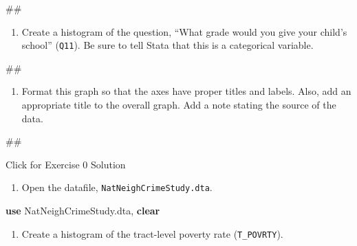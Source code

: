 \documentclass[
]{book}
\newenvironment{Shaded}{\begin{snugshade}}{\end{snugshade}}
\newcommand{\KeywordTok}[1]{\textcolor[rgb]{0.13,0.29,0.53}{\textbf{#1}}}
\newcommand{\NormalTok}[1]{#1}
\providecommand{\tightlist}{%
  \setlength{\itemsep}{0pt}\setlength{\parskip}{0pt}}
\begin{document}
\begin{Shaded}
\begin{Highlighting}[]
\NormalTok{\#\#}
\end{Highlighting}
\end{Shaded}

\begin{enumerate}
\def\labelenumi{\arabic{enumi}.}
\setcounter{enumi}{6}
\tightlist
\item
  Create a histogram of the question, ``What grade would you give your child's school'' (\texttt{Q11}). Be sure to tell Stata that this is a categorical variable.
\end{enumerate}

\begin{Shaded}
\begin{Highlighting}[]
\NormalTok{\#\#}
\end{Highlighting}
\end{Shaded}

\begin{enumerate}
\def\labelenumi{\arabic{enumi}.}
\setcounter{enumi}{7}
\tightlist
\item
  Format this graph so that the axes have proper titles and labels. Also, add an appropriate title to the overall graph. Add a note stating the source of the data.
\end{enumerate}

\begin{Shaded}
\begin{Highlighting}[]
\NormalTok{\#\#}
\end{Highlighting}
\end{Shaded}

{Click for Exercise 0 Solution}

\begin{enumerate}
\def\labelenumi{\arabic{enumi}.}
\tightlist
\item
  Open the datafile, \texttt{NatNeighCrimeStudy.dta}.
\end{enumerate}

\begin{Shaded}
\begin{Highlighting}[]
\KeywordTok{use}\NormalTok{ NatNeighCrimeStudy.dta, }\KeywordTok{clear}
\end{Highlighting}
\end{Shaded}

\begin{enumerate}
\def\labelenumi{\arabic{enumi}.}
\setcounter{enumi}{1}
\tightlist
\item
  Create a histogram of the tract-level poverty rate (\texttt{T\_POVRTY}).
\end{enumerate}
\end{document}
